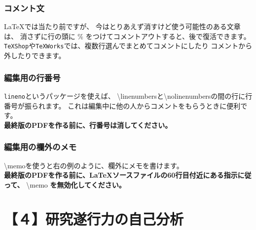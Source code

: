 \documentclass[11pt,a4j,dvipdfmx]{jarticle} 					%
\newcommand{\研究課題名}{象の卵}
\newcommand{\研究機関名}{逢坂大学}
\newcommand{\研究代表者氏名}{湯川秀樹}
\newcommand{\memo}[1]{\marginpar{#1}}
\begin{document}
        \subsubsection{コメント文}
        \LaTeX では当たり前ですが、
        今はとりあえず消すけど使う可能性のある文章は、
        消さずに行の頭に \% をつけてコメントアウトすると、後で復活できます。
        \texttt{TeXShop}や\texttt{TeXWorks}では、複数行選んでまとめてコメントにしたり
        コメントから外したりできます。
        
        \subsubsection{編集用の行番号}
        \texttt{lineno}というパッケージを使えば、
        \textbackslash linenumbersと\textbackslash nolinenumbersの間の行に行番号が振られます。
        これは編集中に他の人からコメントをもらうときに便利です。\\
        \textbf{最終版のPDFを作る前に、行番号は消してください。}
        
        \subsubsection{編集用の欄外のメモ}
        \textbackslash memo{}を使うと右の例のように、欄外にメモを書けます。\\
        \memo{欄外メモ\\だよ}
        \textbf{最終版のPDFを作る前に、\LaTeX ソースファイルの60行目付近にある指示に従って、}
        \textbackslash memo \textbf{を無効化してください。}
        
        \nolinenumbers




\section{【４】研究遂行力の自己分析}
\end{document}
